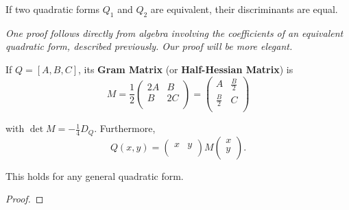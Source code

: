 \documentclass[11pt]{article}
\begin{document}
\begin{theorem}
If two quadratic forms $Q_1$ and $Q_2$ are equivalent, their discriminants are equal.
\end{theorem}

\textit{One proof follows directly from algebra involving the coefficients of an equivalent quadratic form, described previously. Our proof will be more elegant.}

\begin{definition}
If $Q = [A, B, C]$, its \textbf{Gram Matrix} (or \textbf{Half-Hessian Matrix}) is
\[
    M = \frac{1}{2} \begin{pmatrix}
        2A & B  \\
        B & 2C  \\
    \end{pmatrix} =
    \begin{pmatrix}
        A & \frac{B}{2}  \\
        \frac{B}{2} & C  \\
    \end{pmatrix}
\]

with $\det M = -\frac{1}{4} D_Q$. Furthermore,
\[
    Q(x, y) = \begin{pmatrix}
        x & y  \\
    \end{pmatrix} M \begin{pmatrix}
        x \\
        y \\
    \end{pmatrix}.
\]
\end{definition}

\begin{remark}
This holds for any general quadratic form.
\end{remark}

\begin{proof}


\end{proof}
\end{document}
